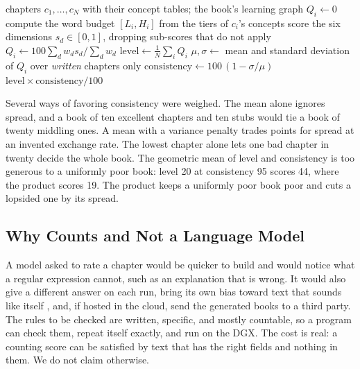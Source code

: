 \begin{algorithm}[htbp]
\caption{Scoring one generated book}
\label{alg:book}
\begin{algorithmic}[1]
\Require chapters $c_1,\dots,c_N$ with their concept tables; the book's learning graph
    \State $Q_i \gets 0$ 
  \Else
    \State compute the word budget $[L_i,H_i]$ from the tiers of $c_i$'s concepts
    \State score the six dimensions $s_d\in[0,1]$, dropping sub-scores that do not apply
    \State $Q_i \gets 100\sum_d w_d s_d \big/ \sum_d w_d$
  \EndIf
\EndFor
\State $\mathrm{level} \gets \frac{1}{N}\sum_{i} Q_i$ 
\State $\mu,\sigma \gets$ mean and standard deviation of $Q_i$ over \emph{written} chapters only
\State $\mathrm{consistency} \gets 100\,(1-\sigma/\mu)$ 
\State \Return $\mathrm{level}\times\mathrm{consistency}/100$
\end{algorithmic}
\end{algorithm}

Several ways of favoring consistency were weighed. The mean alone ignores spread, and a book of ten excellent chapters and ten stubs would tie a book of twenty middling ones. A mean with a variance penalty trades points for spread at an invented exchange rate. The lowest chapter alone lets one bad chapter in twenty decide the whole book. The geometric mean of level and consistency is too generous to a uniformly poor book: level 20 at consistency 95 scores 44, where the product scores 19. The product keeps a uniformly poor book poor and cuts a lopsided one by its spread.

\subsection{Why Counts and Not a Language Model}

A model asked to rate a chapter would be quicker to build and would notice what a regular expression cannot, such as an explanation that is wrong. It would also give a different answer on each run, bring its own bias toward text that sounds like itself \cite{zheng2023judge, panickssery2024selfpref}, and, if hosted in the cloud, send the generated books to a third party. The rules to be checked are written, specific, and mostly countable, so a program can check them, repeat itself exactly, and run on the DGX. The cost is real: a counting score can be satisfied by text that has the right fields and nothing in them. We do not claim otherwise.

